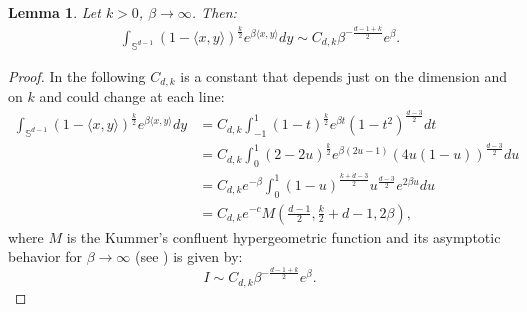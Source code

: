 \documentclass{article}
\numberwithin{theorem}{section}
\newtheorem{lemma}[theorem]{Lemma}
\begin{document}
\begin{lemma}
\label{lem:integral_estimates}
Let $k>0$, $\beta\to\infty$. Then:
\begin{align*}
\int_{\mathbb{S}^{d-1}} (1-\langle x,y\rangle)^{\frac{k}{2}} e^{\beta \langle x, y \rangle} dy \sim C_{d,k} \beta^{-\frac{d-1+k}{2}}e^{\beta}.
\end{align*}
\end{lemma}
\begin{proof}
In the following $C_{d,k}$ is a constant that depends just on the dimension and on $k$ and could change at each line:
\begin{align*}
\int_{\mathbb{S}^{d-1}} (1-\langle x,y\rangle)^{\frac{k}{2}} e^{\beta \langle x, y \rangle} dy &= C_{d,k} \int_{-1}^{1} (1-t)^\frac{k}{2}e^{\beta t} (1-t^2)^\frac{d-3}{2}dt\\
&=C_{d,k}\int_0^1 (2-2u)^\frac{k}{2}e^{\beta(2u-1)}(4u(1-u))^\frac{d-3}{2}du\\
&=C_{d,k} e^{-\beta}\int_0^1 (1-u)^{\frac{k+d-3}{2}}u^\frac{d-3}{2}e^{2\beta u} du\\
&=C_{d,k} e^{-c} M\left(\frac{d-1}{2}, \frac{k}{2}+d-1, 2\beta\right),
\end{align*}
where $M$ is the Kummer's confluent hypergeometric function
and its asymptotic behavior for $\beta\to\infty$ (see \cite{abramowitz1948handbook}) is given by: 
$$
I\sim C_{d,k} \beta^{-\frac{d-1+k}{2}}e^{\beta}.
$$
\end{proof}
\end{document}
